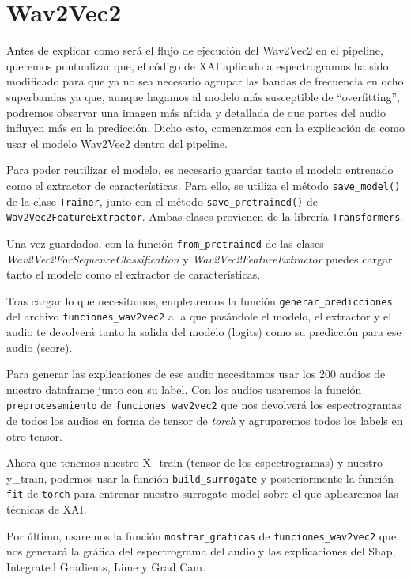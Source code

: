 \section{Wav2Vec2}

Antes de explicar como será el flujo de ejecución del Wav2Vec2 en el pipeline, queremos puntualizar que, el código de XAI aplicado a espectrogramas ha sido modificado para que ya no sea necesario agrupar las bandas de frecuencia en ocho superbandas ya que, aunque hagamos al modelo más susceptible de ``overfitting'', podremos observar una imagen más nítida y detallada de que partes del audio influyen más en la predicción. Dicho esto, comenzamos con la explicación de como usar el modelo Wav2Vec2 dentro del pipeline.

Para poder reutilizar el modelo, es necesario guardar tanto el modelo entrenado como el extractor de características. Para ello, se utiliza el método \texttt{save\_model()} de la clase \texttt{Trainer}, junto con el método \texttt{save\_pretrained()} de \texttt{Wav2Vec2FeatureExtractor}. Ambas clases provienen de la librería \texttt{Transformers}.

Una vez guardados, con la función \texttt{from\_pretrained} de las clases \textit{Wav2Vec2ForSequenceClassification} y \textit{Wav2Vec2FeatureExtractor} puedes cargar tanto el modelo como el extractor de características.

Tras cargar lo que necesitamos, emplearemos la función \texttt{generar\_predicciones} del archivo \texttt{funciones\_wav2vec2} a la que pasándole el modelo, el extractor y el audio te devolverá tanto la salida del modelo (logits) como su predicción para ese audio (score).

Para generar las explicaciones de ese audio necesitamos usar los 200 audios de nuestro dataframe junto con su label. Con los audios usaremos la función \texttt{preprocesamiento} de \texttt{funciones\_wav2vec2} que nos devolverá los espectrogramas de todos los audios en forma de tensor de \textit{torch} y agruparemos todos los labels en otro tensor.

Ahora que tenemos nuestro X\_train (tensor de los espectrogramas) y nuestro y\_train, podemos usar la función \texttt{build\_surrogate} y posteriormente la función \texttt{fit} de \texttt{torch} para entrenar nuestro surrogate model sobre el que aplicaremos las técnicas de XAI.

Por último, usaremos la función \texttt{mostrar\_graficas} de \texttt{funciones\_wav2vec2} que nos generará la gráfica del espectrograma del audio y las explicaciones del Shap, Integrated Gradients, Lime y Grad Cam.

